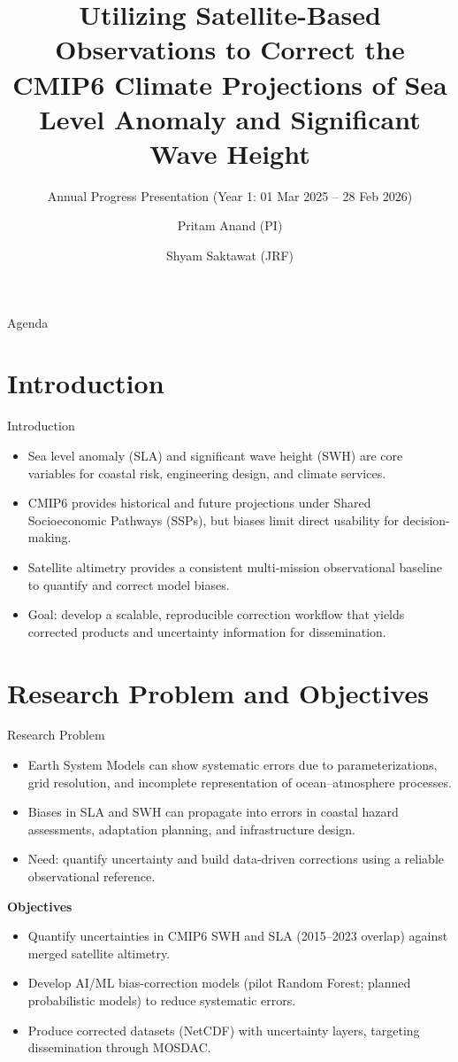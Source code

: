 \documentclass[aspectratio=169,11pt]{beamer}
\title[Annual Progress]{Utilizing Satellite-Based Observations to Correct the CMIP6 Climate Projections of Sea Level Anomaly and Significant Wave Height}
\subtitle{Annual Progress Presentation (Year 1: 01 Mar 2025 -- 28 Feb 2026)}
\author{Pritam Anand (PI) \and Shyam Saktawat (JRF)}
\institute{DA-IICT, Gandhinagar, India}
\date{}
\begin{document}
\begin{frame}
  \titlepage
\end{frame}

\begin{frame}{Agenda}
  \tableofcontents
\end{frame}

\section{Introduction}

\begin{frame}{Introduction}
  \begin{itemize}
    \item Sea level anomaly (SLA) and significant wave height (SWH) are core variables for coastal risk, engineering design, and climate services.
    \item CMIP6 provides historical and future projections under Shared Socioeconomic Pathways (SSPs), but biases limit direct usability for decision-making.
    \item Satellite altimetry provides a consistent multi-mission observational baseline to quantify and correct model biases.
    \item Goal: develop a scalable, reproducible correction workflow that yields corrected products and uncertainty information for dissemination.
  \end{itemize}
\end{frame}

\section{Research Problem and Objectives}

\begin{frame}{Research Problem}
  \begin{itemize}
    \item Earth System Models can show systematic errors due to parameterizations, grid resolution, and incomplete representation of ocean--atmosphere processes.
    \item Biases in SLA and SWH can propagate into errors in coastal hazard assessments, adaptation planning, and infrastructure design.
    \item Need: quantify uncertainty and build data-driven corrections using a reliable observational reference.
  \end{itemize}
  \vspace{0.75em}
  \textbf{Objectives}
  \begin{itemize}
    \item Quantify uncertainties in CMIP6 SWH and SLA (2015--2023 overlap) against merged satellite altimetry.
    \item Develop AI/ML bias-correction models (pilot Random Forest; planned probabilistic models) to reduce systematic errors.
    \item Produce corrected datasets (NetCDF) with uncertainty layers, targeting dissemination through MOSDAC.
  \end{itemize}
\end{frame}
\end{document}
